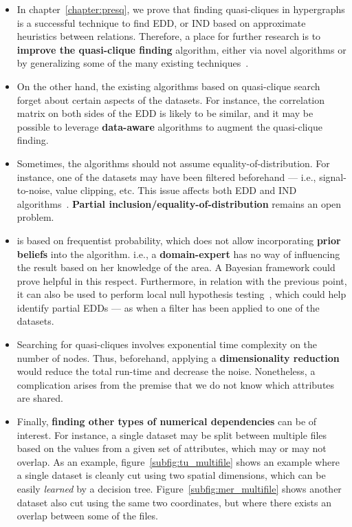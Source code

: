 \begin{itemize}
    \item In chapter~\ref{chapter:presq}, we prove that finding quasi-cliques in hypergraphs
    is a successful technique to find \gls{EDD}, or \gls{IND} based on approximate heuristics
    between relations. Therefore, a place for further research is to
    \textbf{improve the quasi-clique finding} algorithm, either via novel algorithms or by
    generalizing some of the many existing techniques~\cite{WU2015693}.
            
    \item On the other hand, the existing algorithms based on quasi-clique search forget
    about certain aspects of the datasets. For instance, the correlation matrix on both
    sides of the \gls{EDD} is likely to be similar, and it may be possible to leverage
    \textbf{data-aware} algorithms to augment the quasi-clique finding.
    
    \item Sometimes, the algorithms should not assume equality-of-distribution. For instance, one of the
    datasets may have been filtered beforehand --- i.e., signal-to-noise, value clipping, etc. This issue affects
    both \gls{EDD} and \gls{IND} algorithms~\cite{koeller2003discovery}. \textbf{Partial inclusion/equality-of-distribution}
    remains an open problem.
            
    \item \PresQ is based on frequentist probability, which does not allow incorporating \textbf{prior beliefs}
    into the algorithm. i.e., a \textbf{domain-expert} has no way of influencing the result based
    on her knowledge of the area.
    A Bayesian framework could prove helpful in this respect. Furthermore, in relation with the previous point,
    it can also be used to perform local null hypothesis testing~\cite{soriano2015bayesian}, which could help
    identify partial \glspl{EDD} --- as when a filter has been applied to one of the datasets.
    
    \item Searching for quasi-cliques involves exponential time complexity on the number of nodes.
    Thus, beforehand, applying a \textbf{dimensionality reduction} would reduce the total
    run-time and decrease the noise. Nonetheless, a complication arises from the premise that
    we do not know which attributes are shared.
        
    \item Finally, \textbf{finding other types of numerical dependencies} can be of interest.
    For instance, a single dataset may be split between multiple files based on the values
    from a given set of attributes, which may or may not overlap.
    As an example, figure~\ref{subfig:tu_multifile} shows an example where a single dataset is
    cleanly cut using two spatial dimensions, which can be easily \emph{learned} by a decision tree.
    Figure~\ref{subfig:mer_multifile} shows another dataset also cut using the same two
    coordinates, but where there exists an overlap between some of the files.
\end{itemize}

